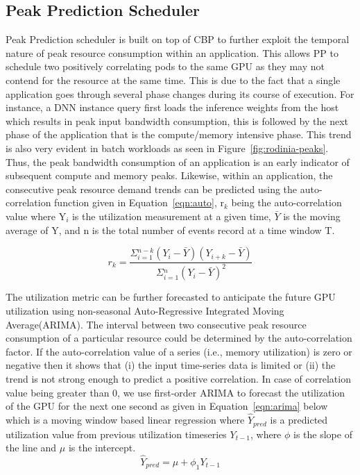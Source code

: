 \subsection{Peak Prediction Scheduler}
Peak Prediction scheduler is built on top of CBP to further exploit the temporal nature of peak resource consumption within an application. This allows PP to schedule two positively correlating pods to the same GPU as they may not contend for the resource at the same time. This is due to the fact that a single application goes through several phase changes during its course of execution. For instance, a DNN instance query first loads the inference weights from the host which results in peak input bandwidth consumption, this is followed by the next phase of the application that is the compute/memory intensive phase. This trend is also very evident in batch workloads as seen in Figure~\ref{fig:rodinia-peaks}. Thus, the peak bandwidth consumption of an application is an early indicator of subsequent compute and memory peaks. Likewise, within an application, the consecutive peak resource demand trends can be predicted using the auto-correlation function given in Equation~\ref{eqn:auto}, r$_{k}$ being the auto-correlation value where Y$_{i}$ is the utilization measurement at a given time, $\bar{Y}$ is the moving average of Y, and n is the total number of events record at a time window T. 

\begin{equation} 
r_{k} = \frac{\Sigma{_{i=1}^{n-k}} (Y_i - \bar{Y})(Y_{i+k} - \bar{Y})} {\Sigma{_{i=1}^{n}}{(Y_i - \bar{Y})}^2}
\label{eqn:auto}
\end{equation}

The utilization metric can be further forecasted to anticipate the future GPU utilization using non-seasonal Auto-Regressive Integrated Moving Average(ARIMA). The interval between two consecutive peak resource consumption of a particular resource could be determined by the auto-correlation factor. If the auto-correlation value of a series (i.e., memory utilization) is zero or negative then it shows that (i) the input time-series data is limited or (ii) the trend is not strong enough to predict a positive correlation. In case of correlation value being greater than 0, we use first-order ARIMA to forecast the utilization of the GPU for the next one second as given in Equation~\ref{eqn:arima} below which is a moving window based linear regression where $\hat{Y}$$_{pred}$ is a predicted utilization value from previous utilization timeseries $Y_{t-1}$, where $\phi$ is the slope of the line and $\mu$ is the intercept.
    \begin{equation} 
    \hat{Y}_{pred} = \mu + \phi_{1} Y_{t-1}
    \label{eqn:arima}
    \end{equation}

